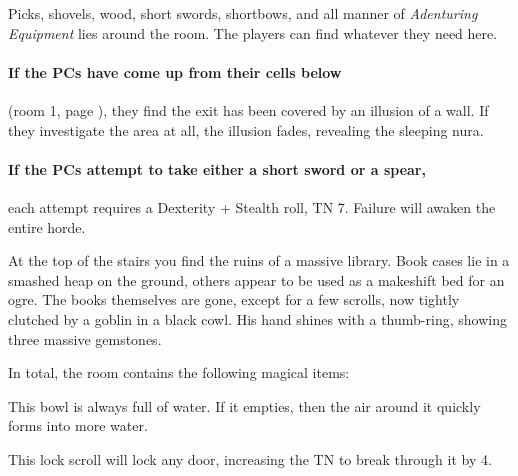 \begin{multicols}{2}
\begin{exampletext}
\end{exampletext}

Picks, shovels, wood, short swords, shortbows, and all manner of \textit{Adenturing Equipment} lies around the room.
The players can find whatever they need here.

\paragraph{If the PCs have come up from their cells below}
(room 1, page \pageref{entrycell}), they find the exit has been covered by an illusion of a wall.
If they investigate the area at all, the illusion fades, revealing the sleeping nura.

\paragraph{If the PCs attempt to take either a short sword or a spear,}
each attempt requires a Dexterity + Stealth roll, TN 7.
Failure will awaken the entire horde.


\addtocounter{enemyNo}{-2}



\begin{boxtext}

	At the top of the stairs you find the ruins of a massive library.
	Book cases lie in a smashed heap on the ground, others appear to be used as a makeshift bed for an ogre.
	The books themselves are gone, except for a few scrolls, now tightly clutched by a goblin in a black cowl.
	His hand shines with a thumb-ring, showing three massive gemstones.

\end{boxtext}

In total, the room contains the following magical items:


This bowl is always full of water.
If it empties, then the air around it quickly forms into more water.


This lock scroll will lock any door, increasing the TN to break through it by 4.



\end{multicols}
